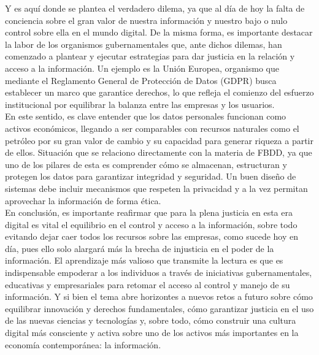 \documentclass[12pt]{report}
\begin{document}
\begin{enumerate}[label=\textbf{\arabic*.}, leftmargin=*]
Y es aquí donde se plantea el verdadero dilema, ya que al día de hoy la falta de conciencia sobre el gran valor de nuestra información y nuestro bajo o nulo control sobre ella en el mundo digital. De la misma forma, es importante destacar la labor de los organismos gubernamentales que, ante dichos dilemas, han comenzado a plantear y ejecutar estrategias para dar justicia en la relación y acceso a la información. Un ejemplo es la Unión Europea, organismo que mediante el Reglamento General de Protección de Datos (GDPR) busca establecer un marco que garantice derechos, lo que refleja el comienzo del esfuerzo institucional por equilibrar la balanza entre las empresas y los usuarios.\\

En este sentido, es clave entender que los datos personales funcionan como activos económicos, llegando a ser comparables con recursos naturales como el petróleo por su gran valor de cambio y su capacidad para generar riqueza a partir de ellos. Situación que se relaciono directamente con la materia de FBDD, ya que uno de los pilares de esta es comprender cómo se almacenan, estructuran y protegen los datos para garantizar integridad y seguridad. Un buen diseño de sistemas debe incluir mecanismos que respeten la privacidad y a la vez permitan aprovechar la información de forma ética.\\

En conclusión, es importante reafirmar que para la plena justicia en esta era digital es vital el equilibrio en el control y acceso a la información, sobre todo evitando dejar caer todos los recursos sobre las empresas, como sucede hoy en día, pues ello solo alargará más la brecha de injusticia en el poder de la información. El aprendizaje más valioso que transmite la lectura es que es indispensable empoderar a los individuos a través de iniciativas gubernamentales, educativas y empresariales para retomar el acceso al control y manejo de su información. Y si bien el tema abre horizontes a nuevos retos a futuro sobre cómo equilibrar innovación y derechos fundamentales, cómo garantizar justicia en el uso de las nuevas ciencias y tecnologías y, sobre todo, cómo construir una cultura digital más consciente y activa sobre uno de los activos más importantes en la economía contemporánea: la información.

        
\end{enumerate}
\end{document}
